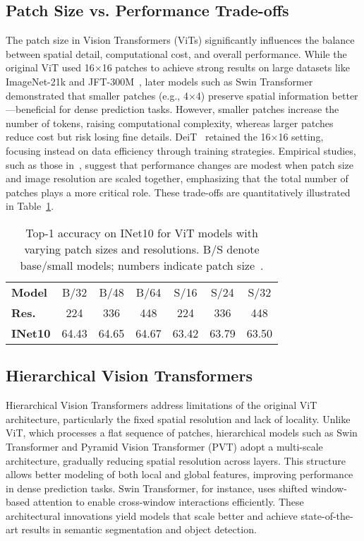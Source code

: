 \documentclass[conference]{IEEEtran}
\begin{document}
\subsection{Patch Size vs. Performance Trade-offs}\label{AA}
The patch size in Vision Transformers (ViTs) significantly influences the balance between spatial detail, computational cost, and overall performance. While the original ViT used 16$\times$16 patches to achieve strong results on large datasets like ImageNet-21k and JFT-300M~\cite{dosovitskiy2021an}, later models such as Swin Transformer~\cite{liu2021swin} demonstrated that smaller patches (e.g., 4$\times$4) preserve spatial information better—beneficial for dense prediction tasks. However, smaller patches increase the number of tokens, raising computational complexity, whereas larger patches reduce cost but risk losing fine details. DeiT~\cite{touvron2021training} retained the 16$\times$16 setting, focusing instead on data efficiency through training strategies. Empirical studies, such as those in~\cite{zhai2022scaling}, suggest that performance changes are modest when patch size and image resolution are scaled together, emphasizing that the total number of patches plays a more critical role. These trade-offs are quantitatively illustrated in Table~\ref{tab:patch_size}.

\begin{table}[ht]
\centering
\caption{Top-1 accuracy on INet10 for ViT models with varying patch sizes and resolutions. B/S denote base/small models; numbers indicate patch size~\cite{zhai2022scaling}.}
\label{tab:patch_size}
\begin{tabular}{lcccccc}
\hline
\textbf{Model} & B/32 & B/48 & B/64 & S/16 & S/24 & S/32 \\
\textbf{Res.} & 224 & 336 & 448 & 224 & 336 & 448 \\
\hline
\textbf{INet10} & 64.43 & 64.65 & 64.67 & 63.42 & 63.79 & 63.50 \\
\hline
\end{tabular}
\end{table}


\subsection{Hierarchical Vision Transformers}
Hierarchical Vision Transformers address limitations of the original ViT architecture, particularly the fixed spatial resolution and lack of locality. Unlike ViT, which processes a flat sequence of patches, hierarchical models such as Swin Transformer \cite{liu2021swin} and Pyramid Vision Transformer (PVT) \cite{wang2021pyramidvisiontransformerversatile} adopt a multi-scale architecture, gradually reducing spatial resolution across layers. This structure allows better modeling of both local and global features, improving performance in dense prediction tasks. Swin Transformer, for instance, uses shifted window-based attention to enable cross-window interactions efficiently. These architectural innovations yield models that scale better and achieve state-of-the-art results in semantic segmentation and object detection.
\vspace{1em}
\end{document}
